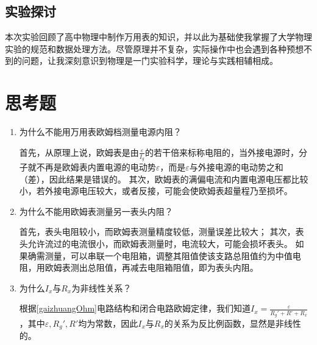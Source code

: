 \documentclass[]{../../templates/Report}
\begin{document}
\begin{fullreportonly}
\subsection{实验探讨}
本次实验回顾了高中物理中制作万用表的知识，并以此为基础使我掌握了大学物理实验的规范和数据处理方法。尽管原理并不复杂，实际操作中也会遇到各种预想不到的问题，让我深刻意识到物理是一门实验科学，理论与实践相辅相成。

\section{思考题}
\begin{enumerate}
    \item 为什么不能用万用表欧姆档测量电源内阻？

        首先，从原理上说，欧姆表是由$\frac{\varepsilon}{I_g}$的若干倍来标称电阻的，当外接电源时，分子就不再是欧姆表内置电源的电动势$\varepsilon$，而是$\varepsilon$与外接电源的电动势之和（差），因此结果是错误的。
        其次，欧姆表的满偏电流和内置电源电压都比较小，若外接电源电压较大，或者反接，可能会使欧姆表超量程乃至损坏。

    \item 为什么不能用欧姆表测量另一表头内阻？

        首先，表头电阻较小，而欧姆表测量精度较低，测量误差比较大；
        其次，表头允许流过的电流很小，而欧姆表测量时，电流较大，可能会损坏表头。
        如果确需测量，可以串联一个电阻箱，调整其阻值使该支路总阻值约为中值电阻，用欧姆表测出总阻值，再减去电阻箱阻值，即为表头内阻。

    \item 为什么$I_x$与$R_x$为非线性关系？

        根据\cref{gaizhuangOhm}电路结构和闭合电路欧姆定律，我们知道$I_x = \frac{\varepsilon}{R_g' + R' + R_x}$，其中$\varepsilon, R_g', R'$均为常数，因此$I_x$与$R_x$的关系为反比例函数，显然是非线性的。
\end{enumerate}
\end{fullreportonly}
\insertnotes
\end{document}
